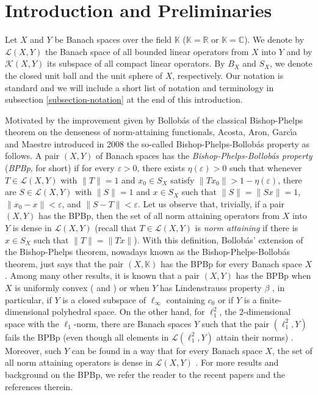 \documentclass[a4paper,10pt]{amsart}
\theoremstyle{plain}
\theoremstyle{definition}
\newcommand{\K}{\mathbb{K}}
\newcommand{\C}{\mathbb{C}}
\newcommand{\R}{\mathbb{R}}
\newcommand{\eps}{\varepsilon}
\begin{document}
\section{Introduction and Preliminaries}

Let $X$ and $Y$ be Banach spaces over the field $\K$ ($\K=\R$ or $\K=\C$). We denote by $\mathcal{L}(X,Y)$ the Banach space of all bounded linear operators from $X$ into $Y$ and by $\mathcal{K}(X,Y)$ its subspace of all compact linear operators. By $B_X$ and $S_X$, we denote the closed unit ball and the unit sphere of $X$, respectively. Our notation is standard and we will include a short list of notation and terminology in subsection \ref{subsection-notation} at the end of this introduction.

Motivated by the improvement given by Bollob\'{a}s of the classical Bishop-Phelps theorem on the denseness of norm-attaining functionals, Acosta, Aron, Garc\'{\i}a and Maestre introduced in 2008 \cite{AAGM} the so-called Bishop-Phelps-Bollob\'{a}s property as follows. A pair $(X,Y)$ of Banach spaces has the \emph{Bishop-Phelps-Bollob\'{a}s property} ({\it BPBp}, for short) if for every $\eps>0$, there exists $\eta(\eps)>0$ such that whenever $T\in \mathcal{L}(X,Y)$ with $\|T\|=1$ and $x_0\in S_X$ satisfy $\|Tx_0\|>1-\eta(\eps)$, there are $S\in \mathcal{L}(X,Y)$ with $\|S\| = 1$ and $x\in S_X$ such that $\|S\|=\|Sx\|=1$, $\|x_0-x\|<\eps$, and $\|S-T\|<\eps$. Let us observe that, trivially, if a pair $(X,Y)$ has the BPBp, then the set of all norm attaining operators from $X$ into $Y$ is dense in $\mathcal{L}(X,Y)$ (recall that $T\in \mathcal{L}(X,Y)$ is \emph{norm attaining} if there is $x\in S_X$ such that $\|T\|=\|Tx\|$). With this definition, Bollob\'{a}s' extension of the Bishop-Phelps theorem, nowadays known as the Bishop-Phelps-Bollob\'{a}s theorem, just says that the pair $(X,\K)$ has the BPBp for every Banach space $X$. Among many other results, it is known that a pair $(X,Y)$ has the BPBp when $X$ is  uniformly convex (\cite[Theorem 2.2]{ABGM} and \cite[Theorem 3.1]{KL}) or when $Y$ has Lindenstrauss property $\beta$ \cite[Theorem 2.2]{AAGM}, in particular, if $Y$ is a closed subspace of $\ell_\infty$ containing $c_0$ or if $Y$ is a finite-dimensional polyhedral space. On the other hand, for $\ell_1^2$, the $2$-dimensional space with the $\ell_1$-norm, there are Banach spaces $Y$ such that the pair $(\ell_1^2,Y)$ fails the BPBp (even though all elements in $\mathcal{L}(\ell_1^2,Y)$ attain their norms) \cite{AAGM}. Moreover, such $Y$ can be found in a way that for every Banach space $X$, the set of all norm attaining operators is dense in $\mathcal{L}(X,Y)$ \cite[Theorem 4.2]{ACKLM}. For more results and background on the BPBp, we refer the reader to the recent papers \cite{AcostaBJM2016, AMS, CGKS, Cho-Choi} and the references therein.
\end{document}
